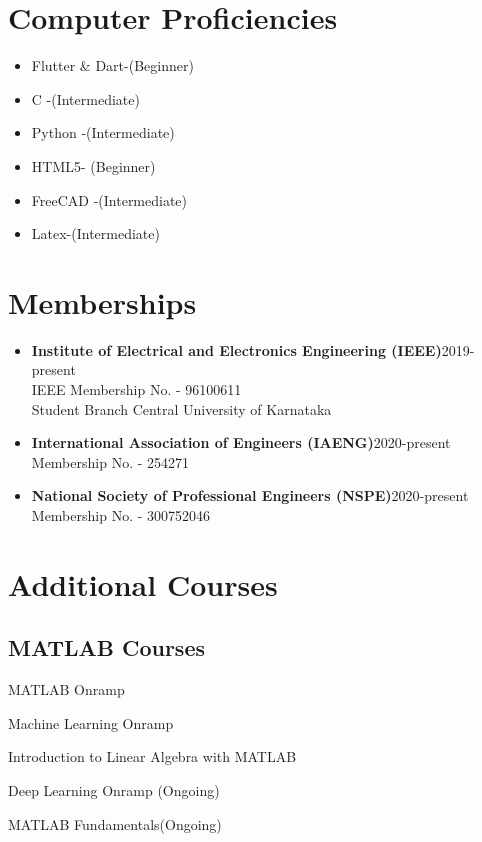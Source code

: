 \documentclass[]{article}
\begin{document}
    \section*{Computer Proficiencies}
    \begin{multicols}{2}[]
    \begin{itemize}
	\item Flutter \& Dart-(Beginner)
        \item C -(Intermediate)
        \item Python -(Intermediate)
        \item HTML5- (Beginner)
        \item FreeCAD -(Intermediate)
        \item Latex-(Intermediate)
    \end{itemize}
    \end{multicols}
    \section*{Memberships}
    \begin{itemize}
        \item \textbf{Institute of Electrical and Electronics Engineering (IEEE)}\hspace{2.95cm}2019-present\\ IEEE Membership No. - 96100611\\ Student Branch Central University of Karnataka
        \item \textbf{International Association of Engineers (IAENG)}\hspace{4.66cm}2020-present\\ Membership No. - 254271
        \item \textbf{National Society of Professional Engineers (NSPE)}\hspace{4.186cm}2020-present\\ Membership No. - 300752046
    \end{itemize}
    \section*{Additional Courses}
    \subsection*{MATLAB Courses}
    \begin{itemize}
    \begin{multicols}{2}
        \item MATLAB Onramp
        \item Machine Learning Onramp
        \item Introduction to Linear Algebra with MATLAB
        \item Deep Learning Onramp (Ongoing)
        \item MATLAB Fundamentals(Ongoing)
    \end{multicols}
    \end{itemize}
\end{document}
